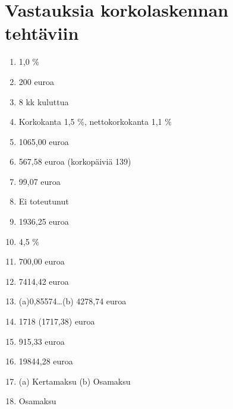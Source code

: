 \documentclass[a4paper,10pt]{article}
\begin{document}
    \pagestyle{empty}
    \section*{Vastauksia korkolaskennan tehtäviin}
    \begin{enumerate}
        \item 1,0 \%
        \item 200 euroa
        \item 8 kk kuluttua
        \item Korkokanta 1,5 \%, nettokorkokanta 1,1 \%
        \item 1065,00 euroa
        \item 567,58 euroa (korkopäiviä 139)
        \item 99,07 euroa
        \item Ei toteutunut
        \item 1936,25 euroa
        \item 4,5 \%
        \item 700,00 euroa
        \item 7414,42 euroa
        \item (a)0,85574\dots (b) 4278,74 euroa
        \item 1718 (1717,38) euroa
        \item 915,33 euroa
        \item 19844,28 euroa
        \item (a) Kertamaksu (b) Osamaksu
        \item Osamaksu
    \end{enumerate}
\end{document}
